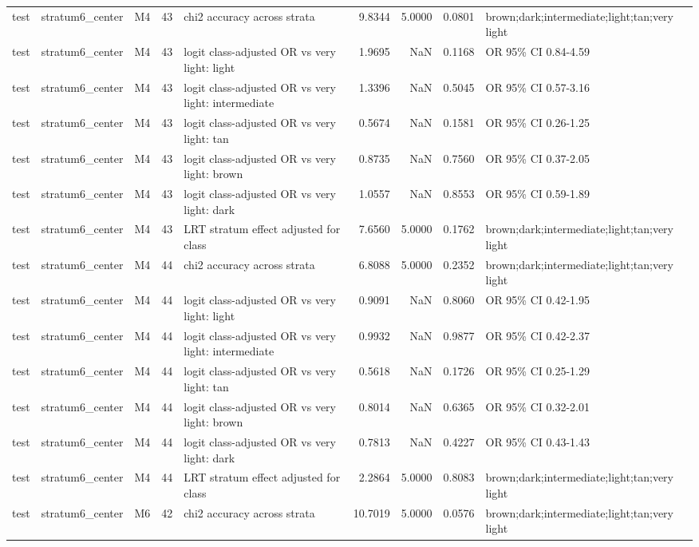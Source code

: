 \begin{tabular}{lllrlrrrl}
test & stratum6\_center & M4 & 43 & chi2 accuracy across strata & 9.8344 & 5.0000 & 0.0801 & brown;dark;intermediate;light;tan;very light \\
test & stratum6\_center & M4 & 43 & logit class-adjusted OR vs very light: light & 1.9695 & NaN & 0.1168 & OR 95\% CI 0.84-4.59 \\
test & stratum6\_center & M4 & 43 & logit class-adjusted OR vs very light: intermediate & 1.3396 & NaN & 0.5045 & OR 95\% CI 0.57-3.16 \\
test & stratum6\_center & M4 & 43 & logit class-adjusted OR vs very light: tan & 0.5674 & NaN & 0.1581 & OR 95\% CI 0.26-1.25 \\
test & stratum6\_center & M4 & 43 & logit class-adjusted OR vs very light: brown & 0.8735 & NaN & 0.7560 & OR 95\% CI 0.37-2.05 \\
test & stratum6\_center & M4 & 43 & logit class-adjusted OR vs very light: dark & 1.0557 & NaN & 0.8553 & OR 95\% CI 0.59-1.89 \\
test & stratum6\_center & M4 & 43 & LRT stratum effect adjusted for class & 7.6560 & 5.0000 & 0.1762 & brown;dark;intermediate;light;tan;very light \\
test & stratum6\_center & M4 & 44 & chi2 accuracy across strata & 6.8088 & 5.0000 & 0.2352 & brown;dark;intermediate;light;tan;very light \\
test & stratum6\_center & M4 & 44 & logit class-adjusted OR vs very light: light & 0.9091 & NaN & 0.8060 & OR 95\% CI 0.42-1.95 \\
test & stratum6\_center & M4 & 44 & logit class-adjusted OR vs very light: intermediate & 0.9932 & NaN & 0.9877 & OR 95\% CI 0.42-2.37 \\
test & stratum6\_center & M4 & 44 & logit class-adjusted OR vs very light: tan & 0.5618 & NaN & 0.1726 & OR 95\% CI 0.25-1.29 \\
test & stratum6\_center & M4 & 44 & logit class-adjusted OR vs very light: brown & 0.8014 & NaN & 0.6365 & OR 95\% CI 0.32-2.01 \\
test & stratum6\_center & M4 & 44 & logit class-adjusted OR vs very light: dark & 0.7813 & NaN & 0.4227 & OR 95\% CI 0.43-1.43 \\
test & stratum6\_center & M4 & 44 & LRT stratum effect adjusted for class & 2.2864 & 5.0000 & 0.8083 & brown;dark;intermediate;light;tan;very light \\
test & stratum6\_center & M6 & 42 & chi2 accuracy across strata & 10.7019 & 5.0000 & 0.0576 & brown;dark;intermediate;light;tan;very light \\

\end{tabular}
